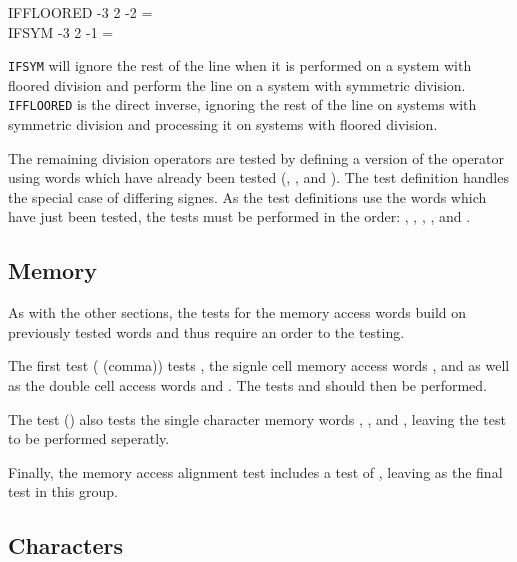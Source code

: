 \begin{tt}
\word{:} IFFLOORED 
	\word{[} -3 2 \word{/} -2 =  \word{]}
	    
\word{;} \\
\word{:} IFSYM \tab[1.8]
	\word{[} -3 2 \word{/} -1 =  \word{]}
	    
\word{;}
\end{tt}

\texttt{IFSYM} will ignore the rest of the line when it is performed
on a system with floored division and perform the line on a system
with symmetric division.  \texttt{IFFLOORED} is the direct inverse,
ignoring the rest of the line on systems with symmetric division and
processing it on systems with floored division.

The remaining division operators are tested by defining a version of
the operator using words which have already been tested (,
,  and ).  The test definition
handles the special case of differing signes.  As the test definitions
use the words which have just been tested, the tests must be performed
in the order:
	,
	,
	,
	, and
	.

\subsection{Memory}

As with the other sections, the tests for the memory access words
build on previously tested words and thus require an order to the
testing.

The first test ( (comma)) tests , the
signle cell memory access words , \word{!} and 
as well as the double cell access words  and .  The
tests  and  should then be
performed.

The test () also tests the single character memory
words , , and , leaving the test
 to be performed seperatly.

Finally, the memory access alignment test 
includes a test of , leaving 
as the final test in this group.

\subsection{Characters}

